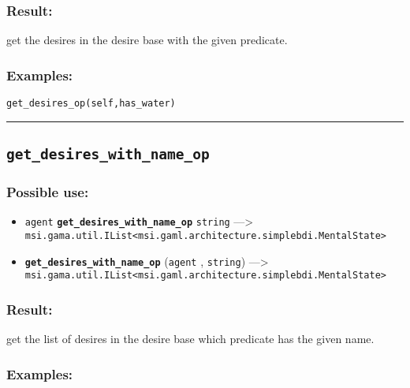 \documentclass[]{book}
\providecommand{\tightlist}{%
  \setlength{\itemsep}{0pt}\setlength{\parskip}{0pt}}
\theoremstyle{definition}
\theoremstyle{definition}
\theoremstyle{definition}
\theoremstyle{remark}
\begin{document}
\subsubsection{Result:}\label{result-199}

get the desires in the desire base with the given predicate.

\subsubsection{Examples:}\label{examples-152}

\begin{verbatim}
get_desires_op(self,has_water) 
\end{verbatim}

\begin{center}\rule{0.5\linewidth}{\linethickness}\end{center}

\subsection{\texorpdfstring{\texttt{get\_desires\_with\_name\_op}}{get\_desires\_with\_name\_op}}\label{get_desires_with_name_op}

\subsubsection{Possible use:}\label{possible-use-206}

\begin{itemize}
\tightlist
\item
  \texttt{agent} \textbf{\texttt{get\_desires\_with\_name\_op}}
  \texttt{string} ---\textgreater{}
  \texttt{msi.gama.util.IList\textless{}msi.gaml.architecture.simplebdi.MentalState\textgreater{}}
\item
  \textbf{\texttt{get\_desires\_with\_name\_op}} (\texttt{agent} ,
  \texttt{string}) ---\textgreater{}
  \texttt{msi.gama.util.IList\textless{}msi.gaml.architecture.simplebdi.MentalState\textgreater{}}
\end{itemize}

\subsubsection{Result:}\label{result-200}

get the list of desires in the desire base which predicate has the given
name.

\subsubsection{Examples:}\label{examples-153}
\end{document}
